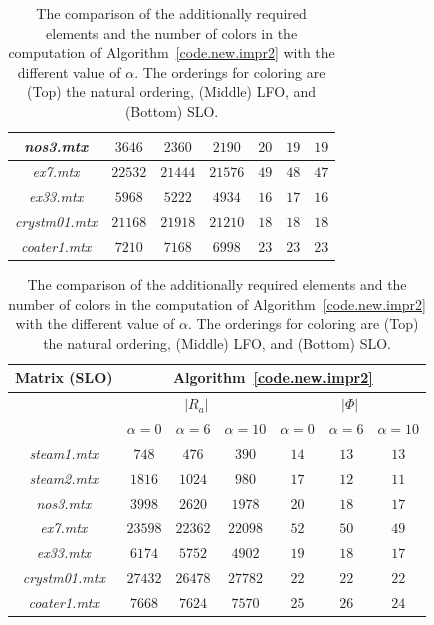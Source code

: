 \documentclass[12pt, twoside,a4paper,toc=bibliography]{scrbook}
\newcommand{\coderef}[1]{Algorithm~\protect\ref{#1}}
\begin{document}
\begin{table}
\begin{tabular}{|c|c|c|c|c|c|c|}
\textit{nos3.mtx} & $3646$ & $2360$ & $2190$ & $20$ & $19$ & $19$ \\\hline
\textit{ex7.mtx} & $22532$ & $21444$ & $21576$ & $49$ & $48$ & $47$ \\\hline
\textit{ex33.mtx} & $5968$ & $5222$ & $4934$ & $16$ & $17$ & $16$ \\\hline
\textit{crystm01.mtx} & $21168$ & $21918$ & $21210$ & $18$ & $18$ & $18$ \\\hline
\textit{coater1.mtx} & $7210$ & $7168$ & $6998$ & $23$ & $23$ & $23$ \\\hline
\end{tabular}
\vspace*{1cm}\newline
\begin{tabular}{|c|c|c|c|c|c|c|}
\hline
Matrix (SLO) & \multicolumn{6}{c|}{\coderef{code.new.impr2}} \\\hline
{} & \multicolumn{3}{c|}{$|R_{a}|$} & \multicolumn{3}{c|}{$|\Phi|$}\\\hline
{} & $\alpha=0$ & $\alpha=6$ & $\alpha=10$ & $\alpha=0$& $\alpha=6$&$\alpha=10$ \\\hline
\textit{steam1.mtx} & $748$ & $476$ & $390$ & $14$ & $13$ & $13$ \\\hline
\textit{steam2.mtx} & $1816$ & $1024$ & $980$ & $17$ & $12$ & $11$ \\\hline
\textit{nos3.mtx} & $3998$ & $2620$ & $1978$ & $20$ & $18$ & $17$ \\\hline
\textit{ex7.mtx} & $23598$ & $22362$ & $22098$ & $52$ & $50$ & $49$ \\\hline
\textit{ex33.mtx} & $6174$ & $5752$ & $4902$ & $19$ & $18$ & $17$ \\\hline
\textit{crystm01.mtx} & $27432$ & $26478$ & $27782$ & $22$ & $22$ & $22$ \\\hline
\textit{coater1.mtx} & $7668$ & $7624$ & $7570$ & $25$ & $26$ & $24$ \\\hline
\end{tabular}
\caption{The comparison of the additionally required elements and the number of colors
in the computation of \coderef{code.new.impr2} with the different value of $\alpha$.
The orderings for coloring are (Top) the natural ordering,
(Middle) LFO, and (Bottom) SLO.}
\label{different.alpha}
\end{table}

\clearpage
\end{document}
